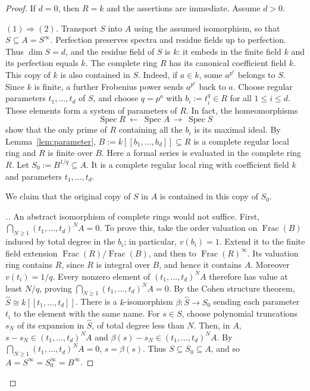 \documentclass[11pt,a4paper]{amsart}
\numberwithin{equation}{section}
\newcommand{\Frac}{\operatorname{Frac}}
\newenvironment{PROOF}[2][\proofname.]
{\begin{proof}[#1]\renewcommand{\qedsymbol}{\textsquare$_{\rm #2}$}}
	{\end{proof}}
\begin{document}
 \begin{proof}
 If $d=0$, then $R=k$ and the assertions are immediate.
 Assume $d>0$.
 	
 \emph{$(1)\Rightarrow(2)$.}
 Transport $S$ into $A$ using the assumed isomorphism, so that
$S\subseteq A=S^\infty$.	Perfection preserves spectra and residue fields up to perfection.	Thus $\dim S=d$, and the residue field of $S$ is $k$: 	it embeds in the finite field $k$ and its perfection equals $k$.	The complete ring $R$ has its canonical coefficient field $k$.	This copy of $k$ is also contained in $S$. 	Indeed, if $a\in k$, some $a^{p^e}$ belongs to $S$. 	Since $k$ is finite, a further Frobenius power sends 	$a^{p^e}$ back to $a$.
 Choose regular parameters $t_1,\ldots,t_d$ of $S$, and choose	$q=p^a$ with $	b_i:=t_i^q\in R$ for all $1\leq i\leq d$.
 These elements form a system of parameters of $R$.
 In fact, the homeomorphisms$$\operatorname{Spec}R
	\ \longleftarrow\ \operatorname{Spec}A
 	\ \longrightarrow\ \operatorname{Spec}S$$
show that the only prime of $R$ containing all the $b_i$
is its maximal ideal. By Lemma~\ref{lem:parameter},
 $	B:=k[[b_1,\ldots,b_d]]\subseteq R $
is a complete regular local ring and $R$ is finite over $B$.
Here a formal series is evaluated in the complete ring $R$.
Let  $S_0:=B^{1/q}\subseteq A$.
It is a complete regular local ring with coefficient field $k$
and parameters $t_1,\ldots,t_d$.
 
 
 \begin{claim}\label{c26}
We claim that the original copy of $S$ in $A$ is contained in
this copy of $S_0$.
 \end{claim}
 
 
 \begin{PROOF}{\ref{c26}}	
An abstract
isomorphism of complete rings would not suffice.
First,
$	\bigcap_{N\geq1}(t_1,\ldots,t_d)^N A=0.$	To prove this, take the order valuation on	$\Frac(B)$ induced by total degree in the $b_i$;	in particular, $v(b_i)=1$.	Extend it to the finite field extension $\Frac(R)/\Frac(B)$,	and then to $\Frac(R)^\infty$.	Its valuation ring contains $R$, since $R$ is integral over $B$,	and hence it contains $A$.	Moreover $v(t_i)=1/q$.	Every nonzero element of $(t_1,\ldots,t_d)^N A$	therefore has value at least $N/q$, proving $	\bigcap_{N\geq1}(t_1,\ldots,t_d)^N A=0.$ 	By the Cohen structure theorem,	$\widehat S\cong k[[t_1,\ldots,t_d]]$.	There is a $k$-isomorphism	$	\beta:\widehat S\to S_0$	sending each parameter $t_i$ to the element with the same name.	For $s\in S$, choose polynomial truncations $s_N$ of its	expansion in $\widehat S$, of total degree less than $N$.	Then, in $A$,
	$ 	s-s_N\in(t_1,\ldots,t_d)^N A$ and $
	\beta(s)-s_N\in(t_1,\ldots,t_d)^N A. $
	By $\bigcap_{N\geq1}(t_1,\ldots,t_d)^N A=0	$, $s=\beta(s)$.
	Thus $S\subseteq S_0\subseteq A$, and so
	$A=S^\infty=S_0^\infty=B^\infty.$
 \end{PROOF} 


\end{proof}
\end{document}

